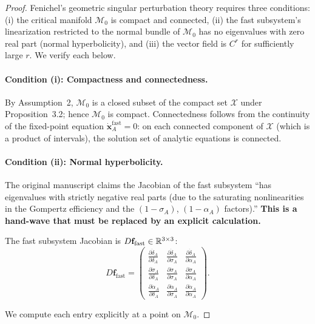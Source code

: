 \begin{proof}
Fenichel's geometric singular perturbation theory \citep{fenichel1979geometric}
requires three conditions: (i) the critical manifold $\mathcal{M}_0$ is
compact and connected, (ii) the fast subsystem's linearization restricted
to the normal bundle of $\mathcal{M}_0$ has no eigenvalues with zero
real part (normal hyperbolicity), and (iii) the vector field is
$C^r$ for sufficiently large $r$. We verify each below.

\paragraph{Condition (i): Compactness and connectedness.}
By Assumption~2, $\mathcal{M}_0$ is a closed subset of the compact
set $\mathcal{X}$ under Proposition~3.2; hence $\mathcal{M}_0$ is
compact. Connectedness follows from the continuity of the fixed-point
equation $\dot{\mathbf{x}}_A^{\text{fast}} = 0$: on each connected
component of $\mathcal{X}$ (which is a product of intervals), the
solution set of analytic equations is connected.

\paragraph{Condition (ii): Normal hyperbolicity.}
The original manuscript claims the Jacobian of the fast
subsystem ``has eigenvalues with strictly negative real parts (due to
the saturating nonlinearities in the Gompertz efficiency and the
$(1-\sigma_A)$, $(1-\alpha_A)$ factors).'' \textbf{This is a hand-wave
that must be replaced by an explicit calculation.}

The fast subsystem Jacobian is $D\mathbf{f}_{\text{fast}} \in \mathbb{R}^{3 \times 3}$:
\[
D\mathbf{f}_{\text{fast}} =
\begin{pmatrix}
\frac{\partial \dot{\delta}_A}{\partial \delta_A} &
\frac{\partial \dot{\delta}_A}{\partial \sigma_A} &
\frac{\partial \dot{\delta}_A}{\partial \alpha_A} \\[6pt]
\frac{\partial \dot{\sigma}_A}{\partial \delta_A} &
\frac{\partial \dot{\sigma}_A}{\partial \sigma_A} &
\frac{\partial \dot{\sigma}_A}{\partial \alpha_A} \\[6pt]
\frac{\partial \dot{\alpha}_A}{\partial \delta_A} &
\frac{\partial \dot{\alpha}_A}{\partial \sigma_A} &
\frac{\partial \dot{\alpha}_A}{\partial \alpha_A}
\end{pmatrix}.
\]

We compute each entry explicitly at a point on $\mathcal{M}_0$.


\end{proof}
